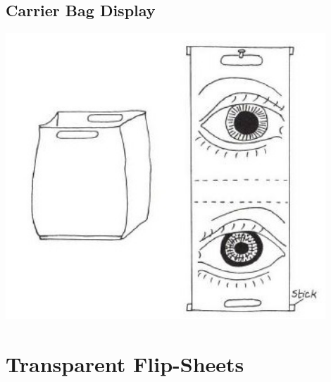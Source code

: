 \subsection{Carrier Bag Display}

\begin{center}
\includegraphics[width=12cm]{./img/vso/carrier-bag.jpg}
\end{center}


%


\section{Transparent Flip-Sheets}

